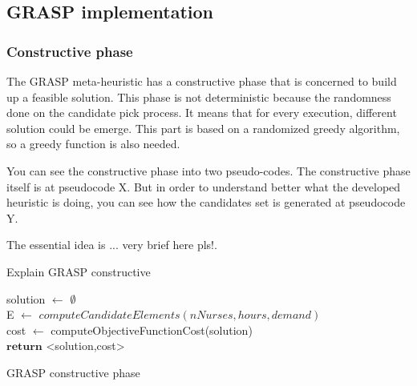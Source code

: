 \subsection{GRASP implementation}

\subsubsection{Constructive phase}

The GRASP meta-heuristic has a constructive phase that is concerned to build up a feasible solution. This phase is not deterministic because the randomness done on the candidate pick process. It means
that for every execution, different solution could be emerge. This part is based on a randomized greedy algorithm, so a greedy function is also needed.

You can see the constructive phase into two pseudo-codes. The constructive phase itself is at pseudocode X. But in order to understand better what the developed heuristic is doing, you can
see how the candidates set is generated at pseudocode Y.

The essential idea is ... very brief here pls!.

\makeatletter 
{} 
\makeatother

Explain GRASP constructive

\begin{algorithm}[H]


solution $\leftarrow$ $\emptyset$ \\
E $\leftarrow$ $computeCandidateElements(nNurses, hours, demand)$ \\
cost $\leftarrow$ computeObjectiveFunctionCost(solution)\\
$\textbf{return}$ <solution,cost>
\caption{GRASP constructive phase}\label{alg.mainLoop}
\end{algorithm}

